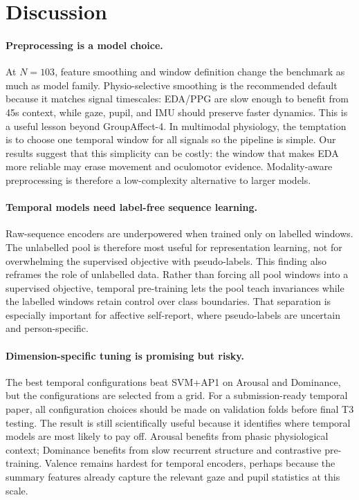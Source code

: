 \documentclass[sigconf,review,anonymous]{acmart}
\begin{document}
\section{Discussion}
\label{sec:discussion}

\paragraph{Preprocessing is a model choice.}
At $N=103$, feature smoothing and window definition change the benchmark as
much as model family.
Physio-selective smoothing is the recommended default because it matches
signal timescales: EDA/PPG are slow enough to benefit from 45s context, while
gaze, pupil, and IMU should preserve faster dynamics.
This is a useful lesson beyond GroupAffect-4.
In multimodal physiology, the temptation is to choose one temporal window for
all signals so the pipeline is simple.
Our results suggest that this simplicity can be costly: the window that makes
EDA more reliable may erase movement and oculomotor evidence.
Modality-aware preprocessing is therefore a low-complexity alternative to
larger models.

\paragraph{Temporal models need label-free sequence learning.}
Raw-sequence encoders are underpowered when trained only on labelled windows.
The unlabelled pool is therefore most useful for representation learning, not
for overwhelming the supervised objective with pseudo-labels.
This finding also reframes the role of unlabelled data.
Rather than forcing all pool windows into a supervised objective, temporal
pre-training lets the pool teach invariances while the labelled windows retain
control over class boundaries.
That separation is especially important for affective self-report, where
pseudo-labels are uncertain and person-specific.

\paragraph{Dimension-specific tuning is promising but risky.}
The best temporal configurations beat SVM+AP1 on Arousal and Dominance, but
the configurations are selected from a grid.
For a submission-ready temporal paper, all configuration choices should be
made on validation folds before final T3 testing.
The result is still scientifically useful because it identifies where temporal
models are most likely to pay off.
Arousal benefits from phasic physiological context; Dominance benefits from
slow recurrent structure and contrastive pre-training.
Valence remains hardest for temporal encoders, perhaps because the summary
features already capture the relevant gaze and pupil statistics at this scale.
\end{document}
